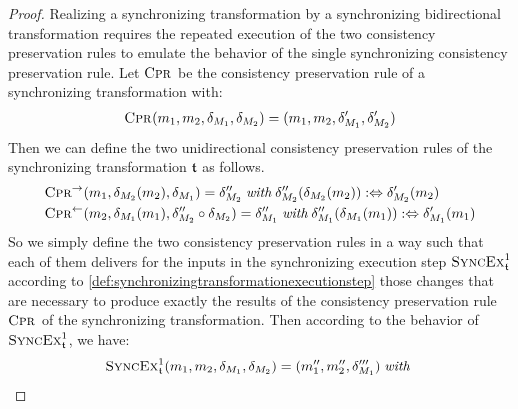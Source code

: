 \begin{proof}
    Realizing a synchronizing transformation by a synchronizing bidirectional transformation requires the repeated execution of the two consistency preservation rules to emulate the behavior of the single 
    synchronizing consistency preservation rule.
    Let $\textsc{Cpr}_{}$ be the consistency preservation rule of a synchronizing transformation with:
    \begin{align*}
        \textsc{Cpr}_{}(m_{1},m_{2},\delta_{M_{1}},\delta_{M_{2}}) = (m_{1},m_{2},\delta_{M_{1}}',\delta_{M_{2}}')
    \end{align*}
    Then we can define the two unidirectional consistency preservation rules of the synchronizing transformation $\mathfrak{t}$ as follows.
    \begin{align*}
        & 
        \textsc{Cpr}_{}^{\rightarrow}(m_{1},\delta_{M_{2}}(m_{2}),\delta_{M_{1}}) = \delta_{M_{2}}'' \; \textit{with} \; \delta_{M_{2}}''(\delta_{M_{2}}(m_{2})) :\Leftrightarrow \delta_{M_{2}}'(m_{2}) \\
        &
        \textsc{Cpr}_{}^{\leftarrow}(m_{2},\delta_{M_{1}}(m_{1}),\delta_{M_{2}}'' \circ \delta_{M_{2}}) = \delta_{M_{1}}'' \; \textit{with} \; \delta_{M_{1}}''(\delta_{M_{1}}(m_{1})) :\Leftrightarrow \delta_{M_{1}}'(m_{1})
    \end{align*}
    So we simply define the two consistency preservation rules in a way such that each of them delivers for the inputs in the synchronizing execution step $\textsc{SyncEx}_{\mathfrak{t}}^1$ according to \autoref{def:synchronizingtransformationexecutionstep} those changes that are necessary to produce exactly the results of the consistency preservation rule $\textsc{Cpr}_{}$ of the synchronizing transformation.
    Then according to the behavior of $\textsc{SyncEx}_{\mathfrak{t}}^1$, we have:
    \begin{align*}
        &
        \function{SyncEx}_{\transformation{t}}^1(\model{m}{1},\model{m}{2},\change{\metamodel{M}{1}},\change{\metamodel{M}{2}}) = (\model{m}{1}'', \model{m}{2}'', \change{\metamodel{M}{1}}''') \mathtext{with} \\

\end{align*}
\end{proof}

